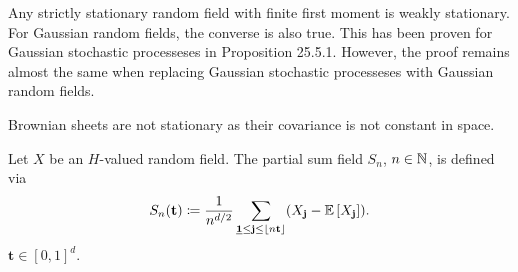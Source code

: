 \begin{ex}[Stationarity]
    \begin{aufzi} 
        \item Any strictly stationary random field with finite first moment is weakly stationary. For Gaussian random fields, the converse is also true. This has been proven for Gaussian stochastic processeses in \cite{lapidoth09} Proposition 25.5.1. However, the proof remains almost the same when replacing Gaussian stochastic processeses with Gaussian random fields.
        \item Brownian sheets are not stationary as their covariance is not constant in space.
    \end{aufzi}
\end{ex}

\begin{defn} \label{defn: partial sum field}
    Let $X$ be an $H$-valued random field. The partial sum field $S_n$, $n \in \mathbb{N}$, is defined via
    \[ S_n(\mathbf{t}) \coloneqq \frac{1}{n^{d/2}} \sum\limits_{\usbf[1] \leq \mathbf{j} \leq \floor{n \mathbf{t}}} (X_\mathbf{j} - \EE{X_\mathbf{j}}). \]
    $\mathbf{t} \in [0,1]^d$.
\end{defn}
